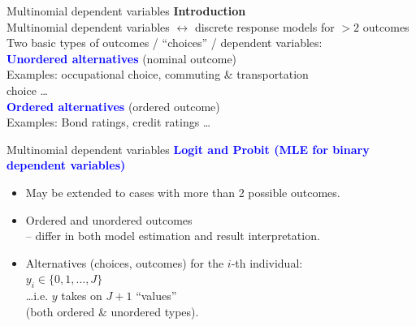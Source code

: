 \documentclass[usenames,dvipsnames]{beamer}
\begin{document}
\begin{frame}{Multinomial dependent variables}
\textbf{Introduction} \\
\bigskip
Multinomial dependent variables $\leftrightarrow$ discrete response models for $ > 2$ outcomes\\
\medskip
Two basic types of outcomes / ``choices'' / dependent variables:\\
\bigskip
\textcolor{Blue}{\textbf{Unordered alternatives}} (nominal outcome) \\
\quad Examples: occupational choice, commuting \& transportation\\ \quad choice \dots \\
\medskip
\textcolor{Blue}{\textbf{Ordered alternatives}} (ordered outcome) \\
\quad Examples: Bond ratings, credit ratings \dots
\end{frame}
\begin{frame}{Multinomial dependent variables}
\textcolor{Blue}{\textbf{Logit and Probit (MLE for binary dependent variables)}}\\
\begin{itemize}
\item May be extended to cases with more than 2 possible outcomes. \\
\medskip
\item Ordered and unordered outcomes\\
– differ in both model estimation and result interpretation. \\
\vspace{0.8cm}
\item Alternatives (choices, outcomes) for the $i$-th individual: \\$y_i \in \{ 0,1, \dots, J \}$ \\
\vspace{0.3cm}
\dots \quad i.e. $y$ takes on $J+1$ ``values'' 
\\ \qquad (both ordered \& unordered types).
\end{itemize}
\end{frame}
\end{document}
